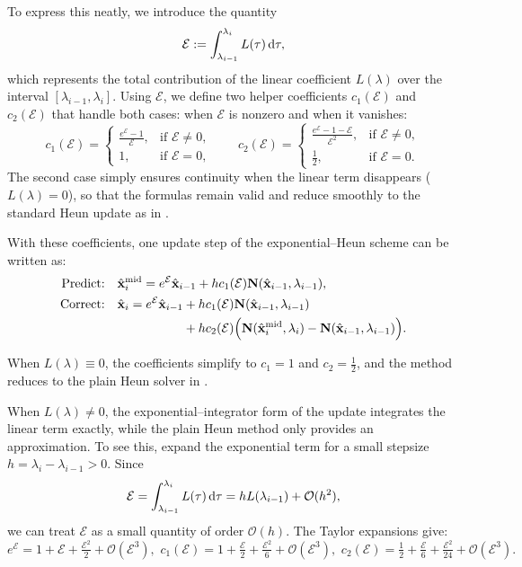 To express this neatly, we introduce the quantity
\[
\mathcal{E} := \int_{\lambda_{i-1}}^{\lambda_{i}} L(\tau) \mathop{}\!\mathrm{d}\tau,
\]
which represents the total contribution of the linear coefficient $L(\lambda)$ over the interval $[\lambda_{i-1}, \lambda_i]$.
Using $\mathcal{E}$, we define two helper coefficients $c_1(\mathcal{E})$ and $c_2(\mathcal{E})$ that handle both cases:
when $\mathcal{E}$ is nonzero and when it vanishes:
\[
c_1(\mathcal{E}) =
\begin{cases}
\tfrac{e^{\mathcal{E}} - 1}{\mathcal{E}}, & \text{if } \mathcal{E}\neq 0,\\[6pt]
1, & \text{if } \mathcal{E}=0,
\end{cases}
\qquad
c_2(\mathcal{E}) =
\begin{cases}
\tfrac{e^{\mathcal{E}} - 1 - \mathcal{E}}{\mathcal{E}^2}, & \text{if } \mathcal{E}\neq 0,\\[6pt]
\tfrac{1}{2}, & \text{if } \mathcal{E}=0.
\end{cases}
\]
The second case simply ensures continuity when the linear term disappears ($L(\lambda)=0$), so that the formulas remain valid and reduce smoothly to the standard Heun update as in .

With these coefficients, one update step of the exponential–Heun scheme can be written as:
\begin{align}\label{eq:exp-heun-logsnr}
\begin{aligned}
    \text{Predict:}\quad 
&\hat{{\mathbf{x}}}^{\mathrm{mid}}_{i} 
= e^{\mathcal{E}}\hat{{\mathbf{x}}}_{i-1} + h c_1(\mathcal{E}) {\mathbf{N}}(\hat{{\mathbf{x}}}_{i-1},\lambda_{i-1}),\\
\text{Correct:}\quad 
&\hat{{\mathbf{x}}}_{i} 
= e^{\mathcal{E}}\hat{{\mathbf{x}}}_{i-1}
\begin{aligned}[t]
    &+ h c_1(\mathcal{E}) {\mathbf{N}}(\hat{{\mathbf{x}}}_{i-1},\lambda_{i-1})
\\&+ h c_2(\mathcal{E})\Big({\mathbf{N}}(\hat{{\mathbf{x}}}^{\mathrm{mid}}_{i},\lambda_{i})-{\mathbf{N}}(\hat{{\mathbf{x}}}_{i-1},\lambda_{i-1})\Big).
\end{aligned}
\end{aligned}
\end{align}

When $L(\lambda)\equiv 0$, the coefficients simplify to $c_1=1$ and $c_2=\tfrac{1}{2}$, and the method reduces to the plain Heun solver in .  

When $L(\lambda)\neq 0$, the exponential–integrator form of the update integrates the linear term
exactly, while the plain Heun method only provides an approximation. 
To see this, expand the exponential term for a small stepsize 
$h = \lambda_i - \lambda_{i-1} > 0$. 
Since 
\[
\mathcal{E} = \int_{\lambda_{i-1}}^{\lambda_i} L(\tau)\mathop{}\!\mathrm{d}\tau 
= h L(\lambda_{i-1}) + \mathcal O(h^2),
\]
we can treat $\mathcal{E}$ as a small quantity of order $\mathcal O(h)$.  The Taylor expansions give:
\[
e^{\mathcal{E}} = 1 + \mathcal{E} + \tfrac{\mathcal{E}^2}{2} + \mathcal O(\mathcal{E}^3),\,\,
c_1(\mathcal{E}) = 1 + \tfrac{\mathcal{E}}{2} + \tfrac{\mathcal{E}^2}{6} + \mathcal O(\mathcal{E}^3),\,\,
c_2(\mathcal{E}) = \tfrac{1}{2} + \tfrac{\mathcal{E}}{6} + \tfrac{\mathcal{E}^2}{24} + \mathcal O(\mathcal{E}^3).
\]

